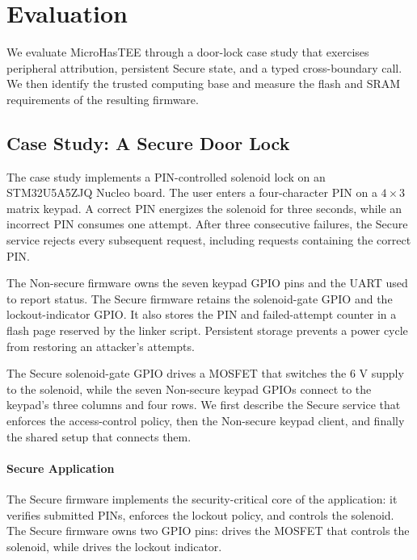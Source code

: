 \documentclass[sigconf]{acmart}
\begin{document}
\section{Evaluation}

We evaluate MicroHasTEE through a door-lock case study that exercises peripheral attribution, persistent Secure state, and a typed cross-boundary call.
We then identify the trusted computing base and measure the flash and SRAM requirements of the resulting firmware.

\subsection{Case Study: A Secure Door Lock}

The case study implements a PIN-controlled solenoid lock on an STM32U5A5ZJQ Nucleo board.
The user enters a four-character PIN on a \(4 \times 3\) matrix keypad.
A correct PIN energizes the solenoid for three seconds, while an incorrect PIN consumes one attempt.
After three consecutive failures, the Secure service rejects every subsequent request, including requests containing the correct PIN.

The Non-secure firmware owns the seven keypad GPIO pins and the UART used to report status.
The Secure firmware retains the solenoid-gate GPIO and the lockout-indicator GPIO.
It also stores the PIN and failed-attempt counter in a flash page reserved by the linker script.
Persistent storage prevents a power cycle from restoring an attacker's attempts.

The Secure solenoid-gate GPIO drives a MOSFET that switches the 6 V supply to the solenoid, while the seven Non-secure keypad GPIOs connect to the keypad's three columns and four rows.
We first describe the Secure service that enforces the access-control policy, then the Non-secure keypad client, and finally the shared setup that connects them.

\paragraph{Secure Application}

The Secure firmware implements the security-critical core of the application: it verifies submitted PINs, enforces the lockout policy, and controls the solenoid.
The Secure firmware owns two GPIO pins:  drives the MOSFET that controls the solenoid, while  drives the lockout indicator.
\end{document}
